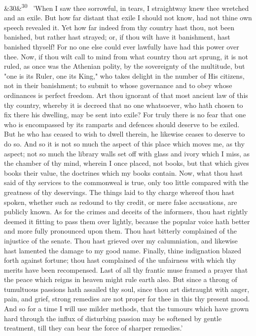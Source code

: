 \documentclass[12pt]{article}
\newcommand{\para}[1][]{\par\noindent\ifx&#1&\else\textsuperscript{\footnotesize #1}~\fi}
\begin{document}
\para[30] 'When I saw thee sorrowful, in tears, I straightway knew thee wretched and an exile. But how far distant that exile I should not know, had not thine own speech revealed it. Yet how far indeed from thy country hast thou, not been banished, but rather hast strayed; or, if thou wilt have it banishment, hast banished thyself! For no one else could ever lawfully have had this power over thee. Now, if thou wilt call to mind from what country thou art sprung, it is not ruled, as once was the Athenian polity, by the sovereignty of the multitude, but "one is its Ruler, one its King," who takes delight in the number of His citizens, not in their banishment; to submit to whose governance and to obey whose ordinances is perfect freedom. Art thou ignorant of that most ancient law of this thy country, whereby it is decreed that no one whatsoever, who hath chosen to fix there his dwelling, may be sent into exile? For truly there is no fear that one who is encompassed by its ramparts and defences should deserve to be exiled. But he who has ceased to wish to dwell therein, he likewise ceases to deserve to do so. And so it is not so much the aspect of this place which moves me, as thy aspect; not so much the library walls set off with glass and ivory which I miss, as the chamber of thy mind, wherein I once placed, not books, but that which gives books their value, the doctrines which my books contain. Now, what thou hast said of thy services to the commonweal is true, only too little compared with the greatness of thy deservings. The things laid to thy charge whereof thou hast spoken, whether such as redound to thy credit, or mere false accusations, are publicly known. As for the crimes and deceits of the informers, thou hast rightly deemed it fitting to pass them over lightly, because the popular voice hath better and more fully pronounced upon them. Thou hast bitterly complained of the injustice of the senate. Thou hast grieved over my calumniation, and likewise hast lamented the damage to my good name. Finally, thine indignation blazed forth against fortune; thou hast complained of the unfairness with which thy merits have been recompensed. Last of all thy frantic muse framed a prayer that the peace which reigns in heaven might rule earth also. But since a throng of tumultuous passions hath assailed thy soul, since thou art distraught with anger, pain, and grief, strong remedies are not proper for thee in this thy present mood. And so for a time I will use milder methods, that the tumours which have grown hard through the influx of disturbing passion may be softened by gentle treatment, till they can bear the force of sharper remedies.'
\end{document}
